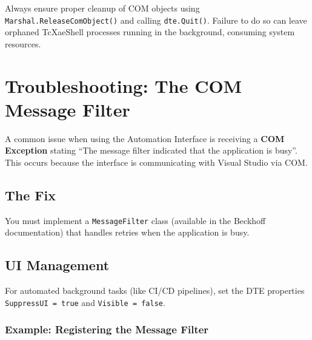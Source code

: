 \documentclass[11pt,a4paper]{article}
\begin{document}
\begin{warningbox}
Always ensure proper cleanup of COM objects using \texttt{Marshal.ReleaseComObject()} and calling \texttt{dte.Quit()}. Failure to do so can leave orphaned TcXaeShell processes running in the background, consuming system resources.
\end{warningbox}

\section{Troubleshooting: The COM Message Filter}

A common issue when using the Automation Interface is receiving a \textbf{COM Exception} stating ``The message filter indicated that the application is busy''. This occurs because the interface is communicating with Visual Studio via COM.

\subsection{The Fix}

You must implement a \texttt{MessageFilter} class (available in the Beckhoff documentation) that handles retries when the application is busy.

\subsection{UI Management}

For automated background tasks (like CI/CD pipelines), set the DTE properties \texttt{SuppressUI = true} and \texttt{Visible = false}.

\subsubsection*{Example: Registering the Message Filter}
\end{document}
